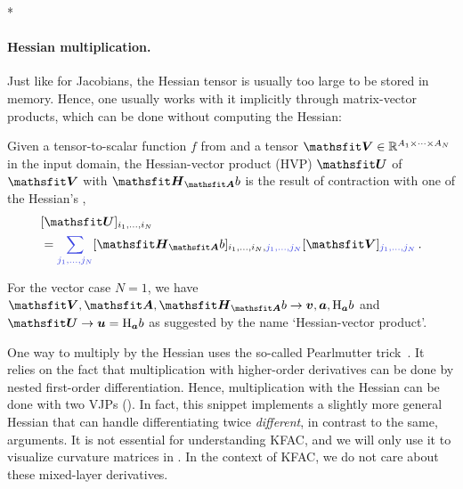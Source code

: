 \switchcolumn[1]*
\switchcolumn[0]

\paragraph{Hessian multiplication.}
Just like for Jacobians, the Hessian tensor is usually too large to be stored in memory.
Hence, one usually works with it implicitly through matrix-vector products, which can be done without computing the Hessian:

\begin{definition}\label{def:hvp}
  Given a tensor-to-scalar function $f$ from  and a tensor $\tV \in \sR^{A_1 \times \dots \times A_N}$ in the input domain, the Hessian-vector product (HVP) $\tU$ of $\tV$ with $\tH_{\tA}b$ is the result of contraction with one of the Hessian's ,
  \begin{align*}
     & [\tU]_{i_1, \dots, i_N}
    \\
     & =
    \colored{\sum_{j_1, \dots, j_N}}
    [\tH_{\tA}b]_{i_1, \dots, i_N, \colored{j_1, \dots, j_N}} [\tV]_{\colored{j_1, \dots, j_N}}\,.
  \end{align*}
\end{definition}
For the vector case $N=1$, we have $\tV, \tA, \tH_{\tA}b \to \vv, \va, \hess_{\va}b$ and $\tU \to \vu = \hess_{\va} b$ as suggested by the name `Hessian-vector product'.

One way to multiply by the Hessian uses the so-called Pearlmutter trick~\cite{pearlmutter1994fast}.
It relies on the fact that multiplication with higher-order derivatives can be done by nested first-order differentiation.
Hence, multiplication with the Hessian can be done with two VJPs ().
In fact, this snippet implements a slightly more general Hessian that can handle differentiating twice \wrt \emph{different}, in contrast to the same, arguments.
It is not essential for understanding KFAC, and we will only use it to visualize curvature matrices in .
In the context of KFAC, we do not care about these mixed-layer derivatives.

